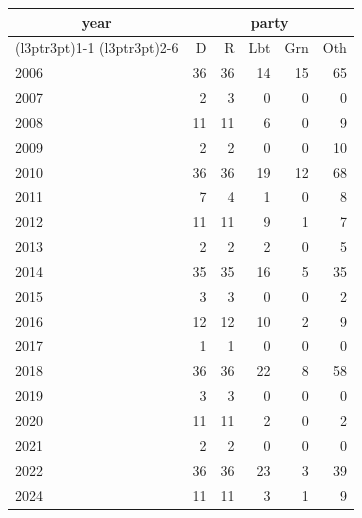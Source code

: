\footnotesize\begin{tabular}[t]{lrrrrr}
\toprule
\multicolumn{1}{c}{year} & \multicolumn{5}{c}{party} \\
\cmidrule(l{3pt}r{3pt}){1-1} \cmidrule(l{3pt}r{3pt}){2-6}
  & D & R & Lbt & Grn & Oth\\
\midrule
2006 & 36 & 36 & 14 & 15 & 65\\
2007 & 2 & 3 & 0 & 0 & 0\\
2008 & 11 & 11 & 6 & 0 & 9\\
2009 & 2 & 2 & 0 & 0 & 10\\
2010 & 36 & 36 & 19 & 12 & 68\\
2011 & 7 & 4 & 1 & 0 & 8\\
2012 & 11 & 11 & 9 & 1 & 7\\
2013 & 2 & 2 & 2 & 0 & 5\\
2014 & 35 & 35 & 16 & 5 & 35\\
2015 & 3 & 3 & 0 & 0 & 2\\
2016 & 12 & 12 & 10 & 2 & 9\\
2017 & 1 & 1 & 0 & 0 & 0\\
2018 & 36 & 36 & 22 & 8 & 58\\
2019 & 3 & 3 & 0 & 0 & 0\\
2020 & 11 & 11 & 2 & 0 & 2\\
2021 & 2 & 2 & 0 & 0 & 0\\
2022 & 36 & 36 & 23 & 3 & 39\\
2024 & 11 & 11 & 3 & 1 & 9\\
\bottomrule
\end{tabular}
